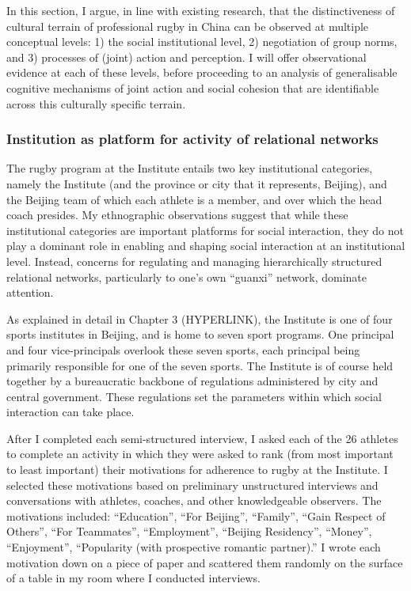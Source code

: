   In this section, I argue, in line with existing research, that the distinctiveness of cultural terrain of professional rugby in China can be observed at multiple conceptual levels: 1) the social institutional level, 2) negotiation of group norms, and 3) processes of (joint) action and perception.  I will offer observational evidence at each of these levels, before proceeding to an analysis of generalisable cognitive mechanisms of joint action and social cohesion that are identifiable across this culturally specific terrain.

  \subsubsection{Institution as platform for activity of relational networks}

  The rugby program at the Institute entails two key institutional categories, namely the Institute (and the province or city that it represents, Beijing), and the Beijing team of which each athlete is a member, and over which the head coach presides.  My ethnographic observations suggest that while these institutional categories are important platforms for social interaction, they do not play a dominant role in enabling and shaping social interaction at an institutional level.  Instead, concerns for regulating and managing hierarchically structured relational networks, particularly to one's own ``guanxi'' network, dominate attention.

  As explained in detail in Chapter 3 (HYPERLINK), the Institute is one
  of four sports institutes in Beijing, and is home to seven sport programs.  One principal and four vice-principals overlook these seven sports, each principal being primarily responsible for one of the seven sports.  The Institute is of course held together by a bureaucratic backbone of regulations administered by city and central government.  These regulations set the parameters within which social interaction can take place.



  After I completed each semi-structured interview, I asked each of the 26 athletes to complete an activity in which they were asked to rank (from most important to least important) their motivations for adherence to rugby at the Institute.  I selected these motivations based on preliminary unstructured interviews and conversations with athletes, coaches, and other knowledgeable observers.  The motivations included: ``Education'', ``For Beijing'', ``Family'', ``Gain Respect of Others'', ``For Teammates'', ``Employment'', ``Beijing Residency'', ``Money'', ``Enjoyment'', ``Popularity (with prospective romantic partner).'' I wrote each motivation down on a piece of paper and scattered them randomly on the surface of a table in my room where I conducted interviews.

